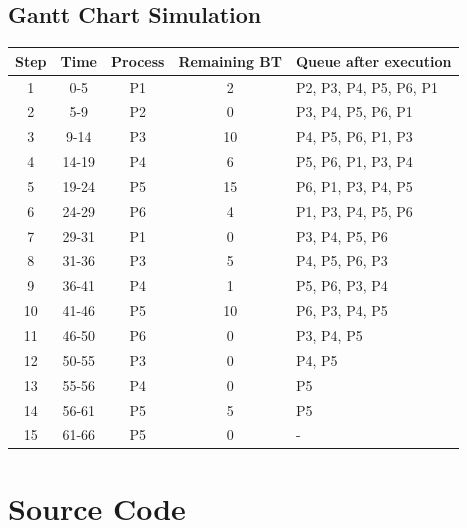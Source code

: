 \documentclass[12pt, a4paper]{article}
\begin{document}
\subsection*{Gantt Chart Simulation}
\begin{table}[H]
    \centering
    \renewcommand{\arraystretch}{1.3}
    \small
    \begin{tabular}{|c|c|c|c|l|}
        \hline
        \textbf{Step} & \textbf{Time} & \textbf{Process} & \textbf{Remaining BT} & \textbf{Queue after execution} \\
        \hline
        1 & 0-5 & P1 & 2 & P2, P3, P4, P5, P6, P1 \\
        2 & 5-9 & P2 & 0 & P3, P4, P5, P6, P1 \\
        3 & 9-14 & P3 & 10 & P4, P5, P6, P1, P3 \\
        4 & 14-19 & P4 & 6 & P5, P6, P1, P3, P4 \\
        5 & 19-24 & P5 & 15 & P6, P1, P3, P4, P5 \\
        6 & 24-29 & P6 & 4 & P1, P3, P4, P5, P6 \\
        7 & 29-31 & P1 & 0 & P3, P4, P5, P6 \\
        8 & 31-36 & P3 & 5 & P4, P5, P6, P3 \\
        9 & 36-41 & P4 & 1 & P5, P6, P3, P4 \\
        10 & 41-46 & P5 & 10 & P6, P3, P4, P5 \\
        11 & 46-50 & P6 & 0 & P3, P4, P5 \\
        12 & 50-55 & P3 & 0 & P4, P5 \\
        13 & 55-56 & P4 & 0 & P5 \\
        14 & 56-61 & P5 & 5 & P5 \\
        15 & 61-66 & P5 & 0 & - \\
        \hline
    \end{tabular}
\end{table}

\section*{Source Code}
\end{document}
